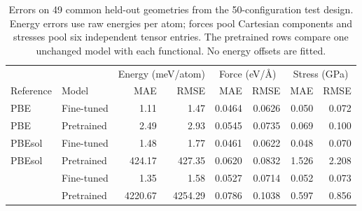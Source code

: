 \begin{table}[t]
\caption{Errors on 49 common held-out geometries from the 50-configuration test design. Energy errors use raw energies per atom; forces pool Cartesian components and stresses pool six independent tensor entries. The pretrained rows compare one unchanged model with each functional. No energy offsets are fitted.}
\label{tab:fit}
\begin{ruledtabular}
\begin{tabular}{llrrrrrr}
 & & \multicolumn{2}{c}{Energy (meV/atom)} & \multicolumn{2}{c}{Force (eV/\AA)} & \multicolumn{2}{c}{Stress (GPa)} \\
Reference & Model & MAE & RMSE & MAE & RMSE & MAE & RMSE \\
\hline
PBE & Fine-tuned & 1.11 & 1.47 & 0.0464 & 0.0626 & 0.050 & 0.072 \\
PBE & Pretrained & 2.49 & 2.93 & 0.0545 & 0.0735 & 0.069 & 0.100 \\
PBEsol & Fine-tuned & 1.48 & 1.77 & 0.0461 & 0.0622 & 0.048 & 0.070 \\
PBEsol & Pretrained & 424.17 & 427.35 & 0.0620 & 0.0832 & 1.526 & 2.208 \\
\rscan{} & Fine-tuned & 1.35 & 1.58 & 0.0527 & 0.0714 & 0.052 & 0.073 \\
\rscan{} & Pretrained & 4220.67 & 4254.29 & 0.0786 & 0.1038 & 0.597 & 0.856 \\
\end{tabular}
\end{ruledtabular}
\end{table}
